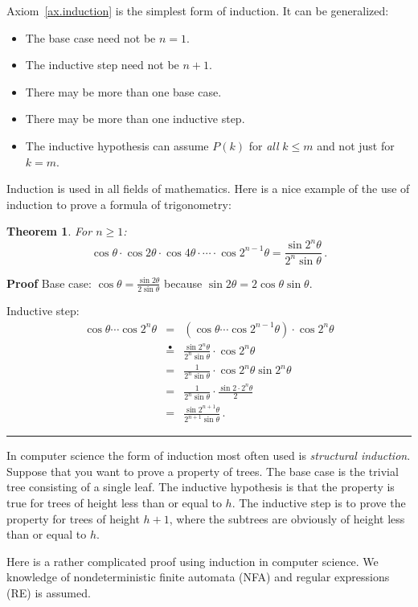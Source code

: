 \documentclass[12pt,a4paper]{article}
\newtheorem{theorem}{Theorem}
\newcommand*{\ih}{\stackrel{\bullet}{=}}
\newcommand*{\qed}{\hfill\rule[-2pt]{4pt}{10pt}}
\newenvironment{proof}{\textbf{Proof}}{\qed}
\begin{document}
Axiom~\ref{ax.induction} is the simplest form of induction. It can be generalized:
\begin{itemize}
\item The base case need not be $n=1$.
\item The inductive step need not be $n+1$.
\item There may be more than one base case.
\item There may be more than one inductive step.
\item The inductive hypothesis can assume $P(k)$ for \emph{all} $k\leq m$ and not just for $k=m$.
\end{itemize}

Induction is used in all fields of mathematics. Here is a nice example of the use of induction to prove a formula of trigonometry:
\begin{theorem}
For $n\geq 1$:
\[
\cos\theta \cdot \cos 2\theta \cdot \cos 4\theta \cdot \cdots \cdot \cos 2^{n-1}\theta = \frac{\sin 2^n\theta}{2^n \sin \theta}\,.
\]
\end{theorem}
\begin{proof}
Base case: $\cos \theta = \frac{\sin 2\theta}{2\sin \theta}$ because $\sin 2\theta = 2\cos\theta\sin\theta$.

Inductive step:
\begin{eqnarray*}
\cos\theta\cdots \cos 2^{n}\theta &=& (\cos\theta\cdots \cos 2^{n-1}\theta) \cdot \cos 2^{n}\theta\\
&\ih{}&\frac{\sin 2^{n}\theta}{2^{n}\sin \theta}\cdot \cos 2^{n}\theta\\
&=& \frac{1}{2^{n}\sin \theta} \cdot \cos 2^n\theta\sin 2^{n}\theta\\
&=& \frac{1}{2^{n}\sin \theta} \cdot \frac{\sin 2\cdot 2^{n}\theta}{2}\\
&=&\frac{\sin 2^{n+1}\theta}{2^{n+1}\sin \theta}\,.
\end{eqnarray*}
\end{proof}

In computer science the form of induction most often used is \emph{structural induction}. Suppose that you want to prove a property of trees. The base case is the trivial tree consisting of a single leaf. The inductive hypothesis is that the property is true for trees of height less than or equal to $h$. The inductive step is to prove the property for trees of height $h+1$, where the subtrees are obviously of height less than or equal to $h$.

Here is a rather complicated proof using induction in computer science. We knowledge of nondeterministic finite automata (NFA) and regular expressions (RE) is assumed.
\end{document}
